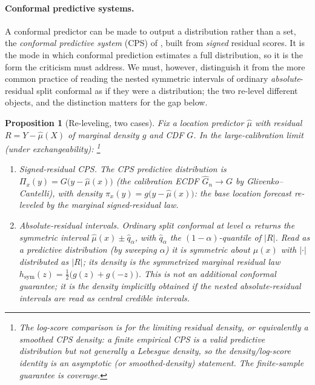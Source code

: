 \documentclass[11pt]{article}
\newtheorem{proposition}{Proposition}
\theoremstyle{definition}
\begin{document}
\paragraph{Conformal predictive systems.} A conformal predictor can be made to output a
distribution rather than a set, the \emph{conformal predictive system} (CPS) of
\citet{vovk2019nonparametric}, built from \emph{signed} residual scores. It is the mode in which conformal
prediction estimates a full distribution, so it is the form the criticism must address. We must, however, distinguish it from the more
common practice of reading the nested symmetric intervals of ordinary
\emph{absolute}-residual split conformal as if they were a distribution; the two re-level
different objects, and the distinction matters for the gap below.

\begin{proposition}[Re-leveling, two cases]\label{prop:relevel}
Fix a location predictor $\hat\mu$ with residual $R=Y-\hat\mu(X)$ of marginal density
$g$ and CDF $G$. In the large-calibration limit (under exchangeability):%
\footnote{The log-score comparison is for the limiting residual density, or equivalently a
smoothed CPS density: a finite empirical CPS is a valid predictive distribution but not
generally a Lebesgue density, so the density/log-score identity is an asymptotic (or
smoothed-density) statement. The finite-sample guarantee is coverage.}
\begin{enumerate}
\item[(A)] Signed-residual CPS. The CPS predictive distribution is
$\Pi_x(y)=G\big(y-\hat\mu(x)\big)$ (the calibration ECDF $\widehat G_n\to G$ by
Glivenko--Cantelli), with density $\pi_x(y)=g\big(y-\hat\mu(x)\big)$: the base location
forecast re-leveled by the marginal signed-residual law.
\item[(B)] Absolute-residual intervals. Ordinary split conformal at
level $\alpha$ returns the symmetric interval $\hat\mu(x)\pm \hat q_\alpha$, with
$\hat q_\alpha$ the $(1-\alpha)$-quantile of $|R|$. Read as a predictive distribution
(by sweeping $\alpha$) it is symmetric about $\hat\mu(x)$ with $|{\cdot}|$ distributed as
$|R|$; its density is the \emph{symmetrized} marginal residual law
$h_{\mathrm{sym}}(z)=\tfrac12\big(g(z)+g(-z)\big)$. This is not an additional conformal
guarantee; it is the density implicitly obtained if the nested absolute-residual intervals
are read as central credible intervals.
\end{enumerate}
\end{proposition}
\end{document}
